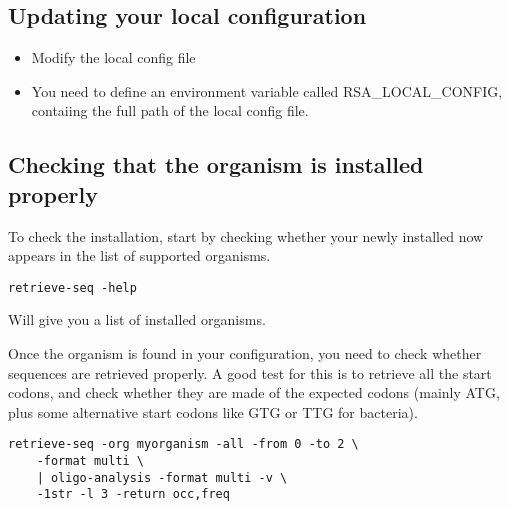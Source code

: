 \subsection{Updating your local configuration}

\begin{itemize}
\item Modify the local config file

\item You need to define an environment variable called
  RSA\_LOCAL\_CONFIG, contaiing the full path of the local config
  file.

\end{itemize}

\subsection{Checking that the organism is installed properly}

To check the installation, start by checking whether your newly
installed now appears in the list of supported organisms.

\begin{verbatim}
retrieve-seq -help
\end{verbatim}

Will give you a list of installed organisms.

Once the organism is found in your configuration, you need to check
whether sequences are retrieved properly. A good test for this is to
retrieve all the start codons, and check whether they are made of the
expected codons (mainly ATG, plus some alternative start codons like
GTG or TTG for bacteria).

\begin{verbatim}
retrieve-seq -org myorganism -all -from 0 -to 2 \
    -format multi \
    | oligo-analysis -format multi -v \
    -1str -l 3 -return occ,freq
\end{verbatim}
